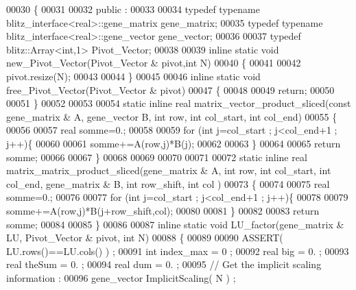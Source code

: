 \begin{DoxyCode}
00030 \{
00031 
00032 public :
00033 
00034   \textcolor{keyword}{typedef} \textcolor{keyword}{typename} blitz\_interface<real>::gene\_matrix gene\_matrix;
00035   \textcolor{keyword}{typedef} \textcolor{keyword}{typename} blitz\_interface<real>::gene\_vector gene\_vector;
00036 
00037   \textcolor{keyword}{typedef} blitz::Array<int,1> Pivot\_Vector;
00038 
00039   \textcolor{keyword}{inline} \textcolor{keyword}{static} \textcolor{keywordtype}{void} new\_Pivot\_Vector(Pivot\_Vector & pivot,\textcolor{keywordtype}{int} N)
00040   \{
00041 
00042     pivot.resize(N);
00043 
00044   \}
00045 
00046   \textcolor{keyword}{inline} \textcolor{keyword}{static} \textcolor{keywordtype}{void} free\_Pivot\_Vector(Pivot\_Vector & pivot)
00047   \{
00048     
00049     \textcolor{keywordflow}{return};
00050 
00051   \}
00052 
00053 
00054   \textcolor{keyword}{static} \textcolor{keyword}{inline} real matrix\_vector\_product\_sliced(\textcolor{keyword}{const} gene\_matrix & A, gene\_vector B, \textcolor{keywordtype}{int} row, \textcolor{keywordtype}{int} 
      col\_start, \textcolor{keywordtype}{int} col\_end)
00055   \{
00056     
00057     real somme=0.;
00058     
00059     \textcolor{keywordflow}{for} (\textcolor{keywordtype}{int} j=col\_start ; j<col\_end+1 ; j++)\{
00060     
00061     somme+=A(row,j)*B(j);
00062     
00063     \}
00064 
00065     \textcolor{keywordflow}{return} somme;
00066 
00067   \}
00068 
00069 
00070 
00071 
00072   \textcolor{keyword}{static} \textcolor{keyword}{inline} real matrix\_matrix\_product\_sliced(gene\_matrix & A, \textcolor{keywordtype}{int} row, \textcolor{keywordtype}{int} col\_start, \textcolor{keywordtype}{int} col\_end, 
      gene\_matrix & B, \textcolor{keywordtype}{int} row\_shift, \textcolor{keywordtype}{int} col )
00073   \{
00074     
00075     real somme=0.;
00076     
00077     \textcolor{keywordflow}{for} (\textcolor{keywordtype}{int} j=col\_start ; j<col\_end+1 ; j++)\{
00078     
00079     somme+=A(row,j)*B(j+row\_shift,col);
00080     
00081     \}
00082 
00083     \textcolor{keywordflow}{return} somme;
00084 
00085   \}
00086 
00087   \textcolor{keyword}{inline} \textcolor{keyword}{static} \textcolor{keywordtype}{void} LU\_factor(gene\_matrix & LU, Pivot\_Vector & pivot, \textcolor{keywordtype}{int} N)
00088   \{
00089 
00090     ASSERT( LU.rows()==LU.cols() ) ;
00091     \textcolor{keywordtype}{int} index\_max = 0 ;
00092     real big = 0. ;
00093     real theSum = 0. ;
00094     real dum = 0. ;
00095     \textcolor{comment}{// Get the implicit scaling information :}
00096     gene\_vector ImplicitScaling( N ) ;

\end{DoxyCode}
